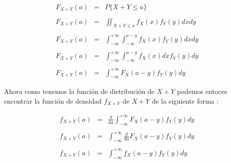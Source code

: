 \documentclass[12pt]{article}
\begin{document}
    \begin{equation*}
        \begin{array}{rcl}
            F_{X + Y}(a) & = & \displaystyle P\{X+Y \leq a\}
            \\
            \\
            F_{X + Y}(a) & = & \displaystyle\iint_{X+Y \leq a} f_X(x)f_Y(y)dxdy
            \\
            \\
            F_{X + Y}(a) & = & \displaystyle\int_{-\infty}^{+\infty}\int_{-\infty}^{a-y} f_X(x)f_Y(y)dxdy
            \\
            \\
            F_{X + Y}(a) & = & \displaystyle\int_{-\infty}^{+\infty}\int_{-\infty}^{a-y} f_X(x)dx f_Y(y)dy
            \\
            \\
            F_{X + Y}(a) & = & \displaystyle\int_{-\infty}^{+\infty} F_X(a-y) f_Y(y)dy
        \end{array}
    \end{equation*}

    \begin{flushleft}
        Ahora como tenemos la funci\'on de distribuci\'on de $X+Y$ podemos entoces encontrar la funci\'on de densidad $f_{X+Y}$ de $ X+Y$ de la siguiente forma :
    \end{flushleft}
     
    \begin{equation*}
        \begin{array}{rcl}
            f_{X + Y}(a) & = & \displaystyle\frac{d}{da}\int_{-\infty}^{+\infty}F_X\left(a-y\right)f_Y(y)dy
            \\
            \\
            f_{X + Y}(a) & = & \displaystyle\int_{-\infty}^{+\infty}\frac{d}{da}F_X\left(a-y\right)f_Y(y)dy
            \\
            \\
            f_{X + Y}(a) & = & \int_{-\infty}^{+\infty}f_X\left(a-y\right)f_Y(y)dy
        \end{array}
     \end{equation*}
\end{document}

